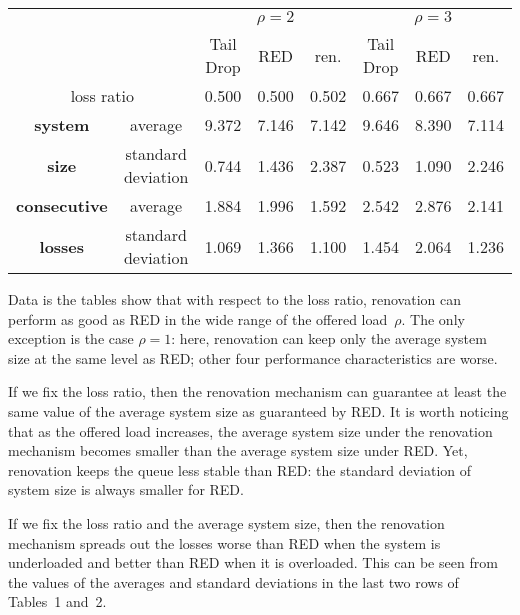 \begin{multicols}{2}
\begin{table*}
\begin{center}
\tabcolsep=8pt
\begin{tabular}{cc|c|c|c||c|c|c|}
\cline{3-8}
                                        &  & \multicolumn{3}{c||}{$\rho=2$} & \multicolumn{3}{c|}{$\rho=3$} \\ \cline{3-8} 
                                        &  &   Tail Drop      & RED     &    ren.   &    Tail Drop   &      RED &    ren.   \\ \hline
\multicolumn{2}{|c|}{loss ratio}    &   0.500    &    0.500        &   0.502     &    0.667   &    0.667       &     0.667      \\ \hline
\multicolumn{1}{|c|}{\textbf{system}} & average &   9.372    &    7.146       &   7.142      &  9.646     &      8.390        &    7.114  \\ \cline{2-8} 
\multicolumn{1}{|c|}{\textbf{size}} & standard deviation &   0.744    &     1.436       &  2.387      &    0.523   &     1.090        &    2.246  \\ \hline
\multicolumn{1}{|c|}{\textbf{consecutive}} &average  &  1.884     &   1.996         &  1.592       &     2.542  &     2.876        &   2.141    \\ \cline{2-8} 
\multicolumn{1}{|c|}{\textbf{losses}} & standard deviation &   1.069    &    1.366        &  1.100      &    1.454   &       2.064       &  1.236        \\ \hline
\end{tabular}
\end{center}
\end{table*}


Data is the tables show that with respect to the loss ratio,
renovation can perform as good as RED in the wide range of the offered load~$\rho$.
The only exception is the case $\rho=1$: here, renovation can keep
only the average system size at the same level as RED; other four 
performance characteristics are worse. 

If we fix the loss ratio, then the renovation mechanism
can guarantee at least the same value of the average system size as guaranteed by RED.
It is worth noticing that as the offered load increases, the average system size 
under the renovation mechanism becomes smaller than the average system size under RED.
Yet, renovation keeps the queue less stable than RED:
the standard deviation of system size is always smaller for RED.

If we fix the loss ratio and the average system size,
then the renovation mechanism spreads out the losses 
worse than RED when the system is underloaded and 
better than RED when it is overloaded.
This can be seen from the values of the averages and
standard deviations in the last two rows of Tables~1 and~2.


\end{multicols}
